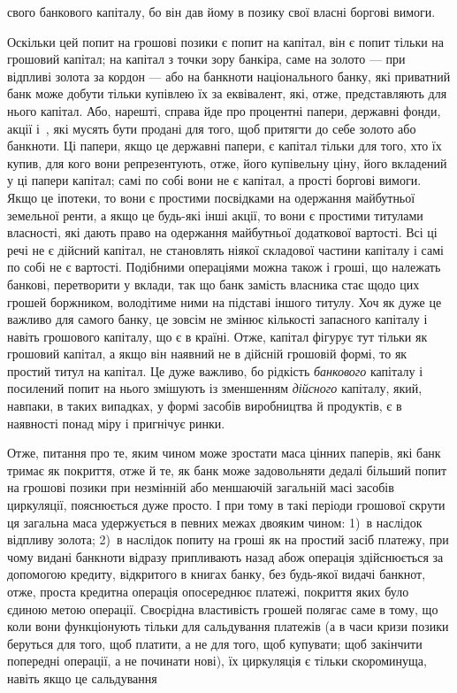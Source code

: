 \parcont{}  %
свого банкового капіталу, бо він дав йому в позику свої власні
боргові вимоги.

Оскільки цей попит на грошові позики є попит на капітал,
він є попит тільки на грошовий капітал; на капітал з точки
зору банкіра, саме на золото — при відпливі золота за кордон —
або на банкноти національного банку, які приватний банк може
добути тільки купівлею їх за еквівалент, які, отже, представляють
для нього капітал. Або, нарешті, справа йде про процентні
папери, державні фонди, акції і~, які мусять бути
продані для того, щоб притягти до себе золото або банкноти.
Ці папери, якщо це державні папери, є капітал тільки для
того, хто їх купив, для кого вони репрезентують, отже, його
купівельну ціну, його вкладений у ці папери капітал; самі по
собі вони не є капітал, а прості боргові вимоги. Якщо це
іпотеки, то вони є простими посвідками на одержання майбутньої
земельної ренти, а якщо це будь-які інші акції, то вони
є простими титулами власності, які дають право на одержання
майбутньої додаткової вартості. Всі ці речі не є дійсний капітал,
не становлять ніякої складової частини капіталу і самі по собі
не є вартості. Подібними операціями можна також і гроші, що
належать банкові, перетворити у вклади, так що банк замість
власника стає щодо цих грошей боржником, володітиме ними
на підставі іншого титулу. Хоч як дуже це важливо для самого
банку, це зовсім не змінює кількості запасного капіталу і навіть
грошового капіталу, що є в країні. Отже, капітал фігурує тут
тільки як грошовий капітал, а якщо він наявний не в дійсній
грошовій формі, то як простий титул на капітал. Це дуже важливо,
бо рідкість \emph{банкового} капіталу і посилений попит на нього
змішують із зменшенням \emph{дійсного} капіталу, який, навпаки, в таких
випадках, у формі засобів виробництва й продуктів, є в наявності
понад міру і пригнічує ринки.

Отже, питання про те, яким чином може зростати маса цінних
паперів, які банк тримає як покриття, отже й те, як банк
може задовольняти дедалі більший попит на грошові позики при
незмінній або меншаючій загальній масі засобів циркуляції,
пояснюється дуже просто. І при тому в такі періоди грошової
скрути ця загальна маса удержується в певних межах двояким
чином: 1)~в наслідок відпливу золота; 2)~в наслідок попиту на
гроші як на простий засіб платежу, при чому видані банкноти
відразу припливають назад абож операція здійснюється за
допомогою кредиту, відкритого в книгах банку, без будь-якої
видачі банкнот, отже, проста кредитна операція опосереднює
платежі, покриття яких було єдиною метою операції. Своєрідна
властивість грошей полягає саме в тому, що коли вони
функціонують тільки для сальдування платежів (а в часи кризи
позики беруться для того, щоб платити, а не для того, щоб
купувати; щоб закінчити попередні операції, а не починати нові), їх
циркуляція є тільки скороминуща, навіть якщо це сальдування
\parbreak{}  %

